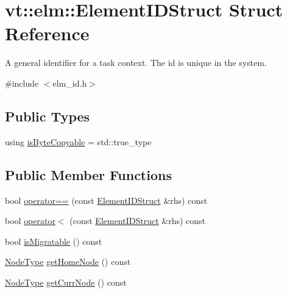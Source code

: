 \hypertarget{structvt_1_1elm_1_1_element_i_d_struct}{}\section{vt\+:\+:elm\+:\+:Element\+I\+D\+Struct Struct Reference}
\label{structvt_1_1elm_1_1_element_i_d_struct}


A general identifier for a task context. The {\ttfamily id} is unique in the system.  




{\ttfamily \#include $<$elm\+\_\+id.\+h$>$}

\subsection*{Public Types}
\begin{DoxyCompactItemize}
\item 
using \hyperlink{structvt_1_1elm_1_1_element_i_d_struct_a1d5b611a29416aee3eb588a723851f8b}{is\+Byte\+Copyable} = std\+::true\+\_\+type
\end{DoxyCompactItemize}
\subsection*{Public Member Functions}
\begin{DoxyCompactItemize}
\item 
bool \hyperlink{structvt_1_1elm_1_1_element_i_d_struct_a98ec58a85fd3e6e809417e17b915b9f5}{operator==} (const \hyperlink{structvt_1_1elm_1_1_element_i_d_struct}{Element\+I\+D\+Struct} \&rhs) const
\item 
bool \hyperlink{structvt_1_1elm_1_1_element_i_d_struct_ac369b3ac1a37cf6958e9373f3f0c89f5}{operator$<$} (const \hyperlink{structvt_1_1elm_1_1_element_i_d_struct}{Element\+I\+D\+Struct} \&rhs) const
\item 
bool \hyperlink{structvt_1_1elm_1_1_element_i_d_struct_a1d01309528dfb6921e3a89feed8132c2}{is\+Migratable} () const
\item 
\hyperlink{namespacevt_a866da9d0efc19c0a1ce79e9e492f47e2}{Node\+Type} \hyperlink{structvt_1_1elm_1_1_element_i_d_struct_a853a49294bc9fe48af9081597e017d39}{get\+Home\+Node} () const
\item 
\hyperlink{namespacevt_a866da9d0efc19c0a1ce79e9e492f47e2}{Node\+Type} \hyperlink{structvt_1_1elm_1_1_element_i_d_struct_afa66d3704b485043da7ba93f05d04737}{get\+Curr\+Node} () const
\end{DoxyCompactItemize}
